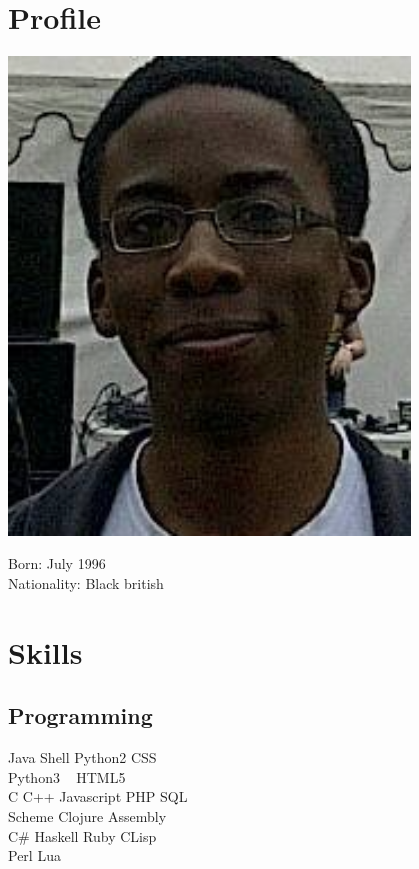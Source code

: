 \documentclass[a4paper]{cv}
\begin{document}
\begin{minipage}[t]{0.33\textwidth} %

\section{Profile}

\includegraphics[width=0.8\textwidth]{profile.png}

Born: July 1996 \\
Nationality: Black british


\section{Skills}

\subsection{Programming}

Java \textbullet{} Shell \textbullet{} Python2 \textbullet{} CSS\\
Python3 \textbullet{} \LaTeXe\ \textbullet{} {\small HTML5} \\\vspace{4pt}
C \textbullet{} C++ \textbullet{} Javascript \textbullet{} PHP \textbullet{} SQL \\
Scheme \textbullet{} Clojure \textbullet{} Assembly \\\vspace{4pt}
C\# \textbullet{} Haskell \textbullet{} Ruby \textbullet{} CLisp \\
Perl \textbullet{} Lua


\end{minipage}
\end{document}
